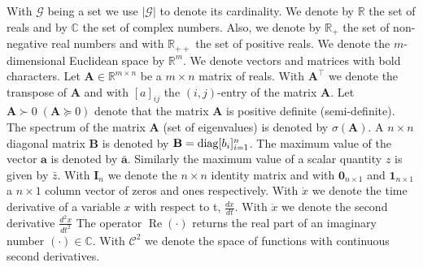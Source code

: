 \documentclass[letterpaper, 10 pt, conference]{ieeeconf}
\newcommand{\diag}{\mathop{\rm diag}}
\newcommand{\matr}[1]{\mathbf{#1}}
\begin{document}
With $\mathcal{G}$ being a set we use $\left\vert\mathcal{G}\right\vert$ to denote its cardinality. We denote by $\mathbb{R}$  the set of reals and by $\mathbb{C}$ the set of complex numbers. Also, we denote by $\mathbb{R}_{+}$ the set of non-negative real numbers and with $\mathbb{R}_{++}$ the set of positive reals. We denote the $m$-dimensional Euclidean space  by $\mathbb{R}^m$. We denote vectors and matrices with bold characters. Let $\matr{A}\in\mathbb{R}^{m\times n}$ be a $m\times n$ matrix of reals. With $\matr{A}^\top$ we denote the transpose of $\matr{A}$ and with $[a]_{ij}$ the $(i,j)$-entry of the matrix $\matr{A}$. Let $\matr{A}\succ0\; (\matr{A}\succeq 0)$ denote that the matrix $\matr{A}$  is positive definite (semi-definite). The spectrum  of the matrix $\matr{A}$ (set of eigenvalues) is denoted by $\sigma(\matr{A})$. A $n\times n$ diagonal matrix $\matr{B}$ is denoted by $\matr{B}=\diag[b_i]_{i=1}^n$.  The maximum value of the vector $\matr{a}$ is denoted by $\bar{\matr{a}}$. 
  Similarly the maximum value of a scalar quantity $z$ is given by $\bar{z}$.  With $\matr{I}_n$ we denote the $n\times n$ identity matrix and with $\matr{0}_{n\times 1}$ and $\matr{1}_{n\times 1}$ a $n\times 1$ column vector of zeros and ones respectively.
 With $\dot{x}$ we denote the time derivative of a variable $x$ with respect to t, $\frac{dx}{dt}$.  With $\ddot{x}$ we denote the second derivative $\frac{d^2 x}{dt^2}$ The operator $\operatorname{Re}(\cdot)$ returns the real part of an imaginary number $(\cdot)\in\mathbb{C}$. With $\mathcal{C}^2$ we denote the space of functions with continuous second derivatives.
\end{document}

